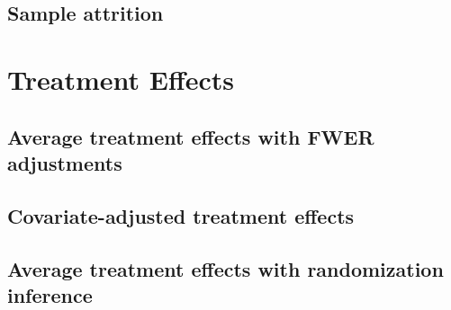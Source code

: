 \documentclass[11pt]{article}
\begin{document}
        
        
        
        

	\clearpage

    \subsection{Sample attrition}

        
        
        

    \clearpage

\section{Treatment Effects}

	\subsection{Average treatment effects with FWER adjustments}
    
		
        
        
		
		
		
        
		

    \clearpage

    \subsection{Covariate-adjusted treatment effects}

        
        
        
        
        
        
        
        

    \clearpage

    \subsection{Average treatment effects with randomization inference}
\end{document}

